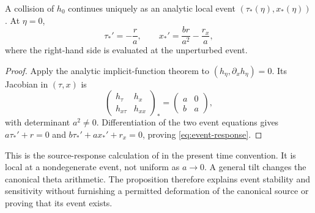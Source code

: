 \begin{proposition}\label{prop:response}
A collision of \(h_0\) continues uniquely as an analytic local
event \((\tau_*(\eta),x_*(\eta))\). At \(\eta=0\),
\begin{equation}\label{eq:event-response}
 \tau_*'=-\frac{r}{a},\qquad
 x_*'=\frac{br}{a^2}-\frac{r_x}{a},
\end{equation}
where the right-hand side is evaluated at the unperturbed event.
\end{proposition}
\begin{proof}
Apply the analytic implicit-function theorem to
\((h_\eta,\partial_xh_\eta)=0\). Its Jacobian in \((\tau,x)\) is
\[
 \begin{pmatrix}h_\tau&h_x\\h_{x\tau}&h_{xx}\end{pmatrix}_{*}
 =\begin{pmatrix}a&0\\b&a\end{pmatrix},
\]
with determinant \(a^2\ne0\). Differentiation of the two event equations
gives \(a\tau_*'+r=0\) and \(b\tau_*'+ax_*'+r_x=0\), proving
\eqref{eq:event-response}.
\end{proof}

This is the source-response calculation of
\cite{SourceResponse} in the present time convention.
It is local at a nondegenerate event, not uniform as \(a\to0\).
A general tilt changes the canonical theta arithmetic. The proposition
therefore explains event stability and sensitivity without furnishing
a permitted deformation of the canonical source or proving that its
event exists.

